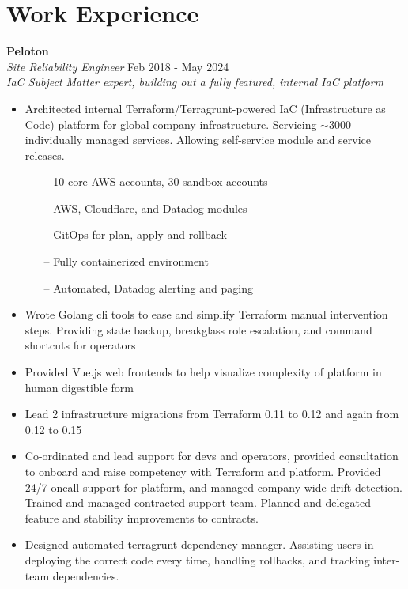 \section{Work Experience}

\begin{minipage}{\textwidth}
  \large{\textbf{Peloton}} \\
  \textit{Site Reliability Engineer} \hfill Feb 2018 - May 2024 \\[3.75pt]
  \textit{IaC Subject Matter expert, building out a fully featured, internal IaC platform}
\end{minipage}

\begin{itemize}
  \item Architected internal Terraform/Terragrunt-powered IaC (Infrastructure as Code) platform for global company infrastructure. Servicing $\sim$3000 individually managed services. Allowing self-service module and service releases.
    \begin{itemize}
      \item[--] 10 core AWS accounts, 30 sandbox accounts
      \item[--] AWS, Cloudflare, and Datadog modules
      \item[--] GitOps for plan, apply and rollback
      \item[--] Fully containerized environment
      \item[--] Automated, Datadog alerting and paging
    \end{itemize}
  \item Wrote Golang cli tools to ease and simplify Terraform manual intervention steps. Providing state backup, breakglass role escalation, and command shortcuts for operators
  \item Provided Vue.js web frontends to help visualize complexity of platform in human digestible form
  \item Lead 2 infrastructure migrations from Terraform 0.11 to 0.12 and again from 0.12 to 0.15
  \item Co-ordinated and lead support for devs and operators, provided consultation to onboard and raise competency with Terraform and platform. Provided 24/7 oncall support for platform, and managed company-wide drift detection. Trained and managed contracted support team. Planned and delegated feature and stability improvements to contracts.
  \item Designed automated terragrunt dependency manager. Assisting users in deploying the correct code every time, handling rollbacks, and tracking inter-team dependencies.

\end{itemize}
